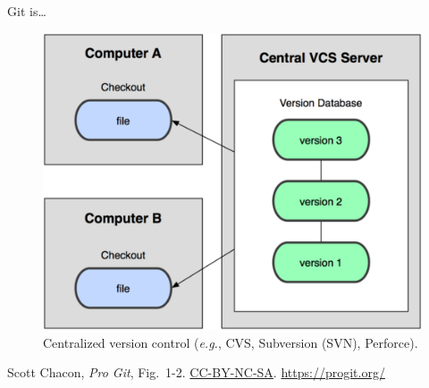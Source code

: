 \begin{frame}{Git is\ldots}
  \begin{figure}
    \includegraphics[scale=0.8]{18333fig0102-tn.png}
    \\ Centralized version control (\emph{e.g.}, CVS, Subversion (SVN), Perforce).
  \end{figure}
  \footnotesize{Scott Chacon,
    \emph{Pro Git},
    Fig.~1-2.
    \href{https://creativecommons.org/licenses/by-nc-sa/3.0/legalcode}{CC-BY-NC-SA}.
    \href{https://progit.org/}{https://progit.org/}}

\end{frame}

